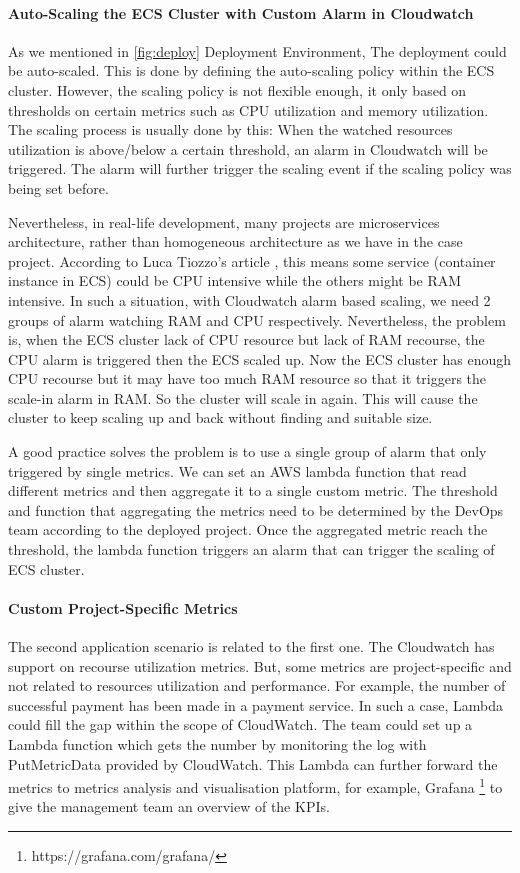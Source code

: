 \paragraph[]{Auto-Scaling the ECS Cluster with Custom Alarm in Cloudwatch}
As we mentioned in \ref{fig:deploy} Deployment Environment, The deployment could be auto-scaled. This is done by defining the auto-scaling policy within the ECS cluster. However, the scaling policy is not flexible enough, it only based on thresholds on certain metrics such as CPU utilization and memory utilization. The scaling process is usually done by this: When the watched resources utilization is above/below a certain threshold, an alarm in Cloudwatch will be triggered. The alarm will further trigger the scaling event if the scaling policy was being set before.
\par
Nevertheless, in real-life development, many projects are microservices architecture, rather than homogeneous architecture as we have in the case project. According to Luca Tiozzo's article \cite{AWSECSho47:online}, this means some service (container instance in ECS) could be CPU intensive while the others might be RAM intensive. In such a situation, with Cloudwatch alarm based scaling, we need 2 groups of alarm watching RAM and CPU respectively. Nevertheless, the problem is, when the ECS cluster lack of CPU resource but lack of RAM recourse, the CPU alarm is triggered then the ECS scaled up. Now the ECS cluster has enough CPU recourse but it may have too much RAM resource so that it triggers the scale-in alarm in RAM. So the cluster will scale in again. This will cause the cluster to keep scaling up and back without finding and suitable size.
\par
A good practice solves the problem is to use a single group of alarm that only triggered by single metrics. We can set an AWS lambda function that read different metrics and then aggregate it to a single custom metric. The threshold and function that aggregating the metrics need to be determined by the DevOps team according to the deployed project. Once the aggregated metric reach the threshold, the lambda function triggers an alarm that can trigger the scaling of ECS cluster. 
\paragraph[]{Custom Project-Specific Metrics}
The second application scenario is related to the first one. The Cloudwatch has support on recourse utilization metrics. But, some metrics are project-specific and not related to resources utilization and performance. For example, the number of successful payment has been made in a payment service. In such a case, Lambda could fill the gap within the scope of CloudWatch. The team could set up a Lambda function which gets the number by monitoring the log with PutMetricData provided by CloudWatch. This Lambda can further forward the metrics to metrics analysis and visualisation platform, for example, Grafana \footnote{https://grafana.com/grafana/} to give the management team an overview of the KPIs.
